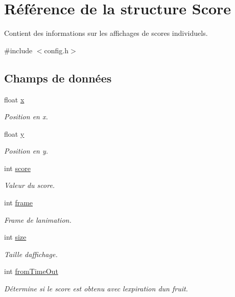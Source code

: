 \hypertarget{struct_score}{}\section{Référence de la structure Score}
\label{struct_score}


Contient des informations sur les affichages de scores individuels.  




{\ttfamily \#include $<$config.\+h$>$}

\subsection*{Champs de données}
\begin{DoxyCompactItemize}
\item 
float \hyperlink{struct_score_a950587a996128c5cf8899382bb811448}{x}
\begin{DoxyCompactList}\small\item\em Position en x. \end{DoxyCompactList}\item 
float \hyperlink{struct_score_a6e160578d4db594b629b9b01c6e041b8}{y}
\begin{DoxyCompactList}\small\item\em Position en y. \end{DoxyCompactList}\item 
int \hyperlink{struct_score_a331b0927105c83ba760954eff6cf9fe9}{score}
\begin{DoxyCompactList}\small\item\em Valeur du score. \end{DoxyCompactList}\item 
int \hyperlink{struct_score_a4203bd2c8f75b527367569fad5af22e8}{frame}
\begin{DoxyCompactList}\small\item\em Frame de l\textquotesingle{}animation. \end{DoxyCompactList}\item 
int \hyperlink{struct_score_aeb05476bfb3d5448f117479a0d5c1bf9}{size}
\begin{DoxyCompactList}\small\item\em Taille d\textquotesingle{}affichage. \end{DoxyCompactList}\item 
int \hyperlink{struct_score_a38bc0a53e2cd2f80b8db25ec7ba1c452}{from\+Time\+Out}
\begin{DoxyCompactList}\small\item\em Détermine si le score est obtenu avec l\textquotesingle{}expiration d\textquotesingle{}un fruit. \end{DoxyCompactList}\item 

\end{DoxyCompactItemize}
